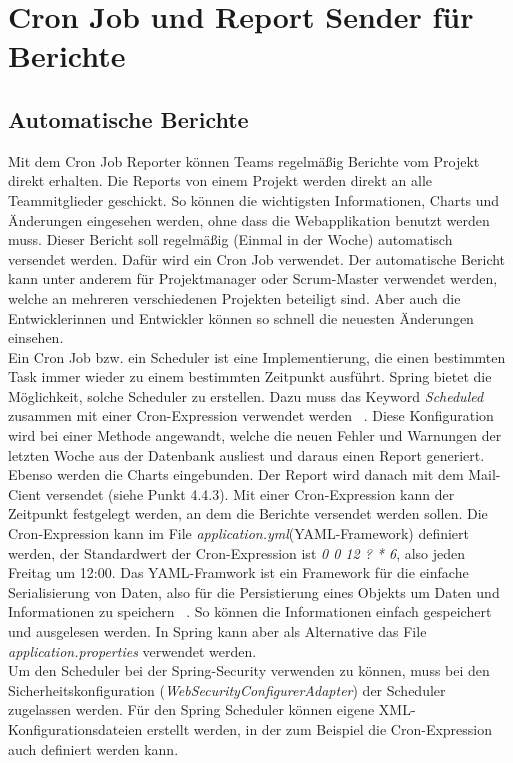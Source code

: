 \section{Cron Job und Report Sender für Berichte}
\subsection{Automatische Berichte} 
Mit dem Cron Job Reporter können Teams regelmäßig Berichte vom Projekt direkt erhalten. Die Reports von einem Projekt werden direkt an alle Teammitglieder geschickt. So können die wichtigsten Informationen, Charts und Änderungen eingesehen werden, ohne dass die Webapplikation benutzt werden muss. Dieser Bericht soll regelmäßig (Einmal in der Woche) automatisch versendet werden. Dafür wird ein Cron Job verwendet. Der automatische Bericht kann unter anderem für Projektmanager oder Scrum-Master verwendet werden, welche an mehreren verschiedenen Projekten beteiligt sind. Aber auch die Entwicklerinnen und Entwickler können so schnell die neuesten Änderungen einsehen. \\ Ein Cron Job bzw. ein Scheduler ist eine Implementierung, die einen bestimmten Task immer wieder zu einem bestimmten Zeitpunkt ausführt. Spring bietet die Möglichkeit, solche Scheduler zu erstellen. Dazu muss das Keyword \textit{Scheduled} zusammen mit einer Cron-Expression verwendet werden ~\parencite{cintirScheduler}. Diese Konfiguration wird bei einer Methode angewandt, welche die neuen Fehler und Warnungen der letzten Woche aus der Datenbank ausliest und daraus einen Report generiert. Ebenso werden die Charts eingebunden. Der Report wird danach mit dem Mail-Cient versendet (siehe Punkt 4.4.3). Mit einer Cron-Expression kann der Zeitpunkt festgelegt werden, an dem die Berichte versendet werden sollen. Die Cron-Expression kann im File \textit{application.yml}(YAML-Framework) definiert werden, der Standardwert der Cron-Expression ist \textit{0 0 12 ? * 6}, also jeden Freitag um 12:00. Das YAML-Framwork ist ein Framework für die einfache Serialisierung von Daten, also für die Persistierung eines Objekts um Daten und Informationen zu speichern ~\parencite{eriksson2011comparison}. So können die Informationen einfach gespeichert und ausgelesen werden. In Spring kann aber als Alternative das File \textit{application.properties} verwendet werden. \\ Um den Scheduler bei der Spring-Security verwenden zu können, muss bei den Sicherheitskonfiguration (\textit{WebSecurityConfigurerAdapter}) der Scheduler zugelassen werden. Für den Spring Scheduler können eigene XML-Konfigurationsdateien erstellt werden, in der zum Beispiel die Cron-Expression auch definiert werden kann.
